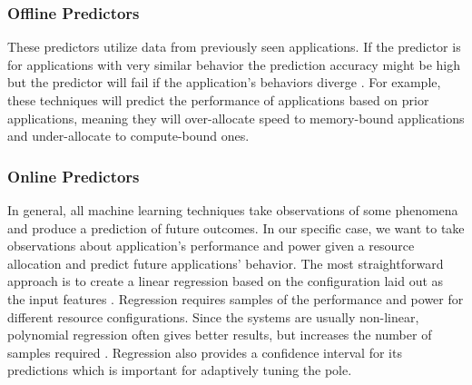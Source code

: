 \subsubsection{Offline Predictors}
These predictors utilize data from previously seen applications. If
the predictor is for applications with very similar behavior the
prediction accuracy might be high but the predictor will fail if the
application's behaviors diverge \cite{meisnerISCA2011,Kim2014}.  For
example, these techniques will predict the performance of applications
based on prior applications, meaning they will over-allocate speed to
memory-bound applications and under-allocate to compute-bound ones.

\subsubsection{Online Predictors}
In general, all machine learning techniques take observations of some
phenomena and produce a prediction of future outcomes.  In our
specific case, we want to take observations about application's
performance and power given a resource allocation and predict future
applications' behavior.  The most straightforward approach is to
create a linear regression based on the configuration laid out as the
input features \cite{tibshirani1996regression,yuan2006model,CPR}.
Regression requires samples of the performance and power for different
resource configurations.  Since the systems are usually non-linear,
polynomial regression often gives better results, but increases the
number of samples required \cite{LeeBrooks}.  Regression also provides
a confidence interval for its predictions which is important for
adaptively tuning the pole.


